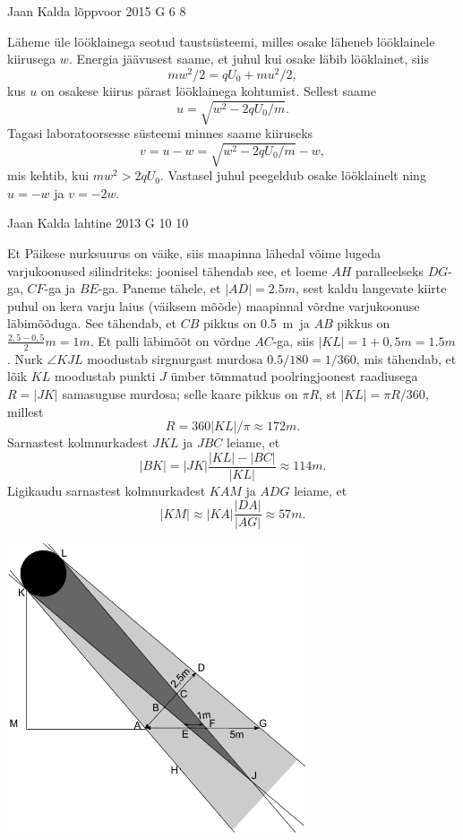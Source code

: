 \documentclass[11pt]{article}
\begin{document}
{%
{Jaan Kalda} %
{lõppvoor} %
{2015} %
{G 6} %
{8} %
{

\ifSolution
Läheme üle lööklainega seotud taustsüsteemi, milles osake läheneb lööklainele kiirusega $w$. Energia jäävusest saame, et juhul kui osake läbib lööklainet, siis 
\[
mw^2/2=qU_0+mu^2/2,
\]
kus $u$ on osakese kiirus pärast lööklainega kohtumist. Sellest saame
\[
u=\sqrt{w^2-2qU_0/m}.
\]
Tagasi laboratoorsesse süsteemi 
minnes saame kiiruseks
\[
v=u-w=\sqrt{w^2-2qU_0/m}-w,
\]
mis kehtib, kui $mw^2>2qU_0$. Vastasel juhul peegeldub osake lööklainelt ning
$u=-w$ ja $v=-2w$.
\fi
}

{Jaan Kalda} %
{lahtine} %
{2013} %
{G 10} %
{10} %
{

\ifSolution
Et Päikese nurksuurus on väike, siis maapinna lähedal võime lugeda varjukoonused silindriteks: joonisel tähendab see, et loeme $AH$ paralleelseks $DG$-ga, $CF$-ga ja $BE$-ga.
Paneme tähele, et $|AD|=\SI{2,5}m$, sest kaldu langevate kiirte puhul on kera varju laius (väiksem mõõde) maapinnal võrdne varjukoonuse läbimõõduga.
See tähendab, et $CB$ pikkus on \SI{0,5}m ja $AB$ pikkus on $\frac{2,5-0,5}2\SI{}m=\SI{1}m$. Et palli läbimõõt on võrdne $AC$-ga, siis $|KL|=1+0,5\SI{}m=\SI{1,5}m$.
Nurk $\angle KJL$ moodustab sirgnurgast murdosa $\num{0,5}/180=1/360$, mis tähendab, et lõik $KL$ moodustab punkti $J$ ümber tõmmatud poolringjoonest raadiusega $R=|JK|$
samasuguse murdosa; selle kaare pikkus on $\pi R$, st $|KL|=\pi R /360$, millest 
\[
R=360|KL|/\pi\approx \SI{172}m.
\]
Sarnastest kolmnurkadest $JKL$ ja $JBC$ leiame, et 
\[
|BK|=|JK|\frac{|KL|-|BC|}{|KL|}\approx \SI{114}m.
\]
Ligikaudu sarnastest kolmnurkadest $KAM$ ja $ADG$ leiame, et
\[
|KM|\approx |KA|\frac{|DA|}{|AG|}\approx \SI{57}m.
\]

\begin{center}
\includegraphics[width=250pt]{2013-lahg-10-pxike-pall-vari}%
\end{center}
\fi
}

}
\end{document}
